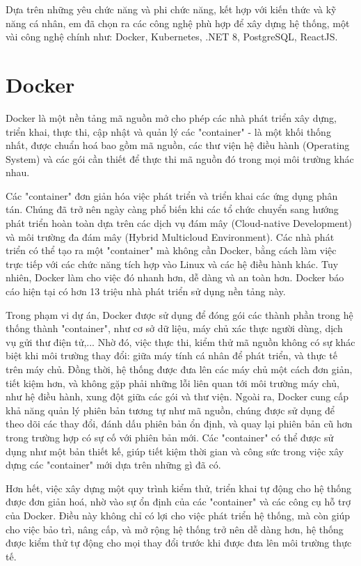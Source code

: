 \documentclass[../DoAn.tex]{subfiles}
\begin{document}
Dựa trên những yêu chức năng và phi chức năng, kết hợp với kiến thức và kỹ năng cá nhân, em đã chọn ra các công nghệ phù hợp để xây dựng hệ thống, một vài công nghệ chính như: Docker,
Kubernetes, .NET 8, PostgreSQL, ReactJS.

\section{Docker}
\label{section:3.1}
Docker là một nền tảng mã nguồn mở cho phép các nhà phát triển xây dựng, triển khai, thực thi, cập nhật và quản lý các "container" -
là một khối thống nhất, được chuẩn hoá bao gồm mã nguồn, các thư viện hệ điều hành (Operating System) và các gói cần thiết để thực thi
mã nguồn đó trong mọi môi trường khác nhau.\cite{DockerOverview}

Các "container" đơn giản hóa việc phát triển và triển khai các ứng dụng phân tán. Chúng đã trở nên ngày càng phổ biến khi các tổ chức chuyển sang hướng phát triển hoàn toàn dựa trên
các dịch vụ đám mây (Cloud-native Development) và môi trường đa đám mây (Hybrid Multicloud Environment).
Các nhà phát triển có thể tạo ra một "container" mà không cần Docker, bằng cách làm việc trực tiếp với các chức năng tích hợp vào Linux và các hệ điều hành khác.
Tuy nhiên, Docker làm cho việc đó nhanh hơn, dễ dàng và an toàn hơn. Docker báo cáo hiện tại có hơn 13 triệu nhà phát triển sử dụng nền tảng này.\cite{DockerIBM}

Trong phạm vi dự án, Docker được sử dụng để đóng gói các thành phần trong hệ thống thành "container", như cơ sở dữ liệu, máy chủ xác thực người dùng, dịch vụ gửi thư điện tử,...
Nhờ đó, việc thực thi, kiểm thử mã nguồn không có sự khác biệt khi môi trường thay đổi: giữa máy tính cá nhân để phát triển, và thực tế trên máy chủ.
Đồng thời, hệ thống được đưa lên các máy chủ một cách đơn giản, tiết kiệm hơn, và không gặp phải những lỗi liên quan tới môi trường máy chủ, như hệ điều hành, xung đột giữa các gói và thư viện.
Ngoài ra, Docker cung cấp khả năng quản lý phiên bản tương tự như mã nguồn, chúng được sử dụng để theo dõi các thay đổi, đánh dấu phiên bản ổn định, và quay lại phiên bản cũ hơn
trong trường hợp có sự cố với phiên bản mới. Các "container" có thể được sử dụng như một bản thiết kế, giúp tiết kiệm thời gian và công sức trong việc
xây dựng các "container" mới dựa trên những gì đã có.\cite{DockerIBM}

Hơn hết, việc xây dựng một quy trình kiểm thử, triển khai tự động cho hệ thống được đơn giản hoá, nhờ vào sự ổn định của các "container" và các công cụ hỗ trợ của Docker.
Điều này không chỉ có lợi cho việc phát triển hệ thống, mà còn giúp cho việc bảo trì, nâng cấp, và mở rộng hệ thống trở nên dễ dàng hơn, hệ thống được kiểm thử tự động cho mọi thay đổi
trước khi được đưa lên môi trường thực tế.\cite{DockerIBM}
\end{document}
